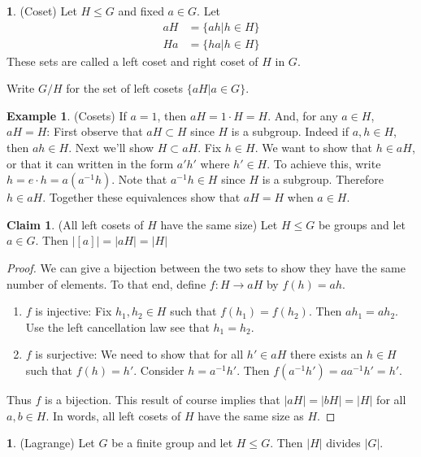 \documentclass[12pt]{article}
\theoremstyle{definition}
\newtheorem{definition}{\color{NavyBlue}{\textbf{Definition}}}
\newtheorem{theorem}{\color{ForestGreen}{\textbf{Theorem}}}
\newtheorem{claim}{\color{JungleGreen}Claim}
\newtheorem{example}{\color{WildStrawberry}Example}
\theoremstyle{definition}
\begin{document}
\begin{definition}(Coset)
Let $H \leq G$ and fixed $a \in G$. Let
\begin{align*}
aH &= \{ ah | h \in H \} \\
Ha &= \{ ha | h \in H \} 
\end{align*}
These sets are called a left coset and right coset of $H$ in $G$. 

Write $G/H$ for the set of left cosets $\{aH | a \in G \}$.
\end{definition}

\begin{example}(Cosets)
If $a=1$, then $aH = 1 \cdot H = H$. And, for any $a \in H$, $aH = H$: First observe that $aH \subset H$ since $H$ is a subgroup. Indeed if $a,h \in H$, then $ah \in H$. Next we'll show $H \subset aH$. Fix $h \in H$. We want to show that $h \in aH$, or that it can written in the form $a'h'$ where $h' \in H$. To achieve this, write $h = e \cdot h = a (a^{-1} h)$. Note that $a^{-1} h \in H$ since $H$ is a subgroup. Therefore $h \in aH$. Together these equivalences show that $aH = H$ when $a \in H$. 
\end{example}

\begin{claim}(All left cosets of $H$ have the same size) 
Let $H \leq G$ be groups and let $a \in G$. Then $|[a] | = |aH| = |H|$
\end{claim}
\begin{proof}
We can give a bijection between the two sets to show they have the same number of elements. To that end, define $f: H \to aH$ by $f(h) = ah$. 
\begin{enumerate}
	\item $f$ is injective: Fix $h_1, h_2 \in H$ such that $f(h_1) = f(h_2)$. Then $a h_1 = a h_2$. Use the left cancellation law see that $h_1 = h_2$. 
	\item $f$ is surjective: We need to show that for all $h' \in aH$ there exists an $h \in H$ such that $f(h) = h'$. Consider $h = a^{-1} h'$. Then $f(a^{-1} h') = a a^{-1} h' = h'$. 
\end{enumerate}
Thus $f$ is a bijection. This result of course implies that $|aH| = |bH| = |H|$ for all $a, b \in H$. In words, all left cosets of $H$ have the same size as $H$. 
\end{proof}

\begin{theorem}(Lagrange)
	Let $G$ be a finite group and let $H \leq G$. Then $|H|$ divides $|G|$.
\end{theorem}
\end{document}
